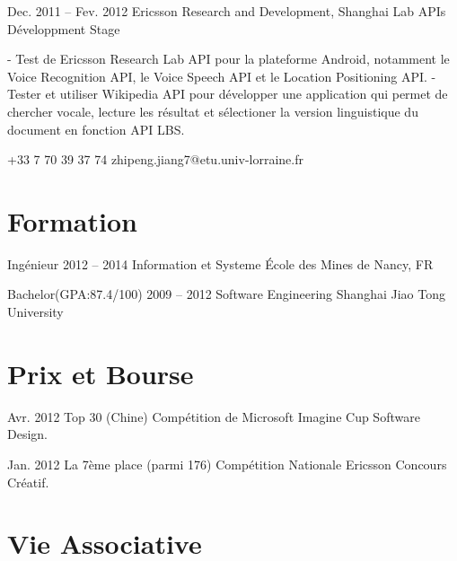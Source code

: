 \documentclass{tccv}
\begin{document}
\begin{eventlist}
\item{Dec. 2011 -- Fev. 2012}
     {Ericsson Research and Development, Shanghai}
     {Lab APIs Développment Stage}

- Test de Ericsson Research Lab API pour la plateforme Android, notamment le Voice Recognition API, le Voice Speech API et le Location Positioning API.
\newline
- Tester et utiliser Wikipedia API pour développer une application qui permet de chercher vocale, lecture les résultat et sélectioner la version linguistique du document en fonction API LBS.

\end{eventlist}

    {+33 7 70 39 37 74}
    {zhipeng.jiang7@etu.univ-lorraine.fr}

\section{Formation}

\begin{yearlist}

\item[Ingénieur]{2012 -- 2014}
     {Information et Systeme}
     {École des Mines de Nancy, FR}

\item[Bachelor(GPA:87.4/100)]{2009 -- 2012}
     {Software Engineering}
     {Shanghai Jiao Tong University}

\end{yearlist}

\section{Prix et Bourse}

\begin{yearlist}

\item{Avr. 2012}
     {Top 30 (Chine)}
     {Compétition de Microsoft Imagine Cup Software Design.}
     
\item{Jan. 2012}
     {La 7ème place (parmi 176)}
     {Compétition Nationale Ericsson Concours Créatif.}

\end{yearlist}

\section{Vie Associative}
\end{document}
